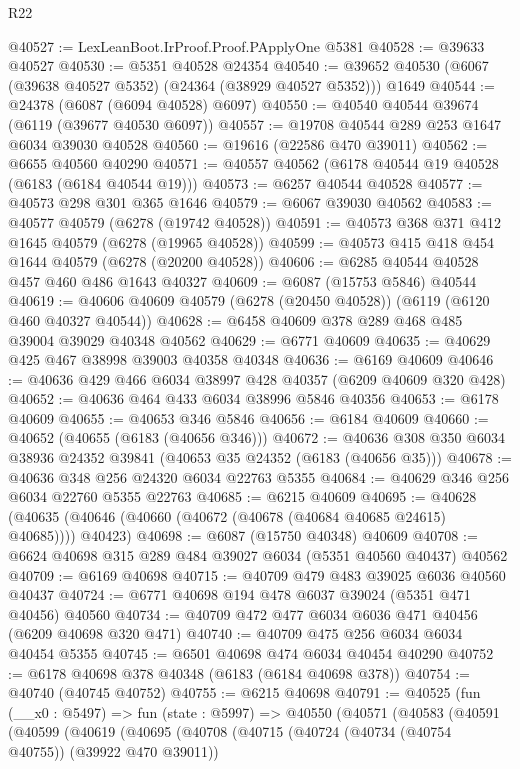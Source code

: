 \begin{lexlean}{R22}
\begin{coremodule}
@40527 := LexLeanBoot.IrProof.Proof.PApplyOne @5381
@40528 := @39633 @40527
@40530 := @5351 @40528 @24354
@40540 := @39652 @40530 (@6067 (@39638 @40527 @5352) (@24364 (@38929 @40527 @5352))) @1649
@40544 := @24378 (@6087 (@6094 @40528) @6097)
@40550 := @40540 @40544 @39674 (@6119 (@39677 @40530 @6097))
@40557 := @19708 @40544 @289 @253 @1647 @6034 @39030 @40528
@40560 := @19616 (@22586 @470 @39011)
@40562 := @6655 @40560 @40290
@40571 := @40557 @40562 (@6178 @40544 @19 @40528 (@6183 (@6184 @40544 @19)))
@40573 := @6257 @40544 @40528
@40577 := @40573 @298 @301 @365 @1646
@40579 := @6067 @39030 @40562
@40583 := @40577 @40579 (@6278 (@19742 @40528))
@40591 := @40573 @368 @371 @412 @1645 @40579 (@6278 (@19965 @40528))
@40599 := @40573 @415 @418 @454 @1644 @40579 (@6278 (@20200 @40528))
@40606 := @6285 @40544 @40528 @457 @460 @486 @1643 @40327
@40609 := @6087 (@15753 @5846) @40544
@40619 := @40606 @40609 @40579 (@6278 (@20450 @40528)) (@6119 (@6120 @460 @40327 @40544))
@40628 := @6458 @40609 @378 @289 @468 @485 @39004 @39029 @40348 @40562
@40629 := @6771 @40609
@40635 := @40629 @425 @467 @38998 @39003 @40358 @40348
@40636 := @6169 @40609
@40646 := @40636 @429 @466 @6034 @38997 @428 @40357 (@6209 @40609 @320 @428)
@40652 := @40636 @464 @433 @6034 @38996 @5846 @40356
@40653 := @6178 @40609
@40655 := @40653 @346 @5846
@40656 := @6184 @40609
@40660 := @40652 (@40655 (@6183 (@40656 @346)))
@40672 := @40636 @308 @350 @6034 @38936 @24352 @39841 (@40653 @35 @24352 (@6183 (@40656 @35)))
@40678 := @40636 @348 @256 @24320 @6034 @22763 @5355
@40684 := @40629 @346 @256 @6034 @22760 @5355 @22763
@40685 := @6215 @40609
@40695 := @40628 (@40635 (@40646 (@40660 (@40672 (@40678 (@40684 @40685 @24615) @40685)))) @40423)
@40698 := @6087 (@15750 @40348) @40609
@40708 := @6624 @40698 @315 @289 @484 @39027 @6034 (@5351 @40560 @40437) @40562
@40709 := @6169 @40698
@40715 := @40709 @479 @483 @39025 @6036 @40560 @40437
@40724 := @6771 @40698 @194 @478 @6037 @39024 (@5351 @471 @40456) @40560
@40734 := @40709 @472 @477 @6034 @6036 @471 @40456 (@6209 @40698 @320 @471)
@40740 := @40709 @475 @256 @6034 @6034 @40454 @5355
@40745 := @6501 @40698 @474 @6034 @40454 @40290
@40752 := @6178 @40698 @378 @40348 (@6183 (@6184 @40698 @378))
@40754 := @40740 (@40745 @40752)
@40755 := @6215 @40698
@40791 := @40525
    (fun (__x0 : @5497) =>
    fun (state : @5997) =>
    @40550
      (@40571
        (@40583
          (@40591
            (@40599
              (@40619
                (@40695
                  (@40708
                    (@40715
                      (@40724 (@40734 (@40754 @40755)) (@39922 @470 @39011))

\end{coremodule}
\end{lexlean}
